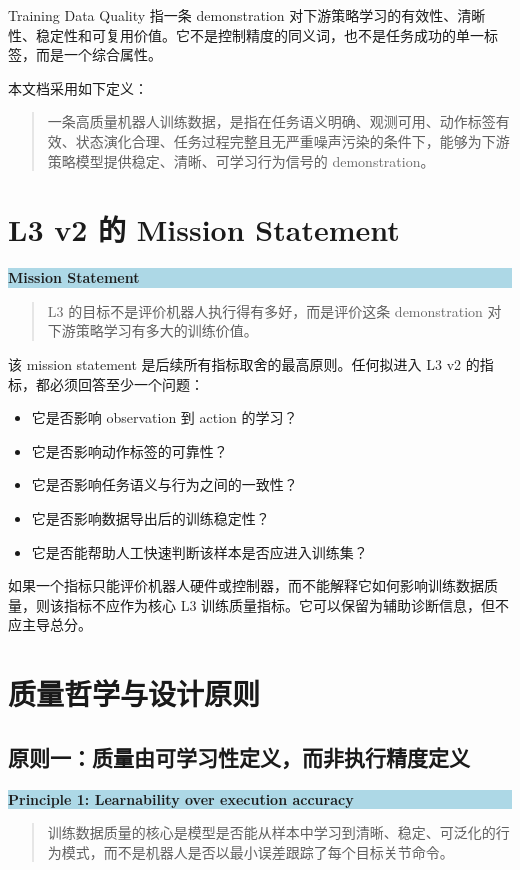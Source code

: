 \documentclass[UTF8,zihao=-4]{ctexart}
\newenvironment{principlebox}[1]{%
  \vspace{0.5em}\noindent\colorbox{LightBlue}{\parbox{0.97\linewidth}{\textbf{#1}\par\vspace{0.25em}}
  }\par\vspace{-0.8em}\noindent\begin{quote}\small
}{\end{quote}\vspace{0.4em}}
\begin{document}
Training Data Quality 指一条 demonstration 对下游策略学习的有效性、清晰性、稳定性和可复用价值。它不是控制精度的同义词，也不是任务成功的单一标签，而是一个综合属性。

本文档采用如下定义：

\begin{quote}
一条高质量机器人训练数据，是指在任务语义明确、观测可用、动作标签有效、状态演化合理、任务过程完整且无严重噪声污染的条件下，能够为下游策略模型提供稳定、清晰、可学习行为信号的 demonstration。
\end{quote}

\section{L3 v2 的 Mission Statement}

\begin{principlebox}{Mission Statement}
L3 的目标不是评价机器人执行得有多好，而是评价这条 demonstration 对下游策略学习有多大的训练价值。
\end{principlebox}

该 mission statement 是后续所有指标取舍的最高原则。任何拟进入 L3 v2 的指标，都必须回答至少一个问题：

\begin{itemize}
  \item 它是否影响 observation 到 action 的学习？
  \item 它是否影响动作标签的可靠性？
  \item 它是否影响任务语义与行为之间的一致性？
  \item 它是否影响数据导出后的训练稳定性？
  \item 它是否能帮助人工快速判断该样本是否应进入训练集？
\end{itemize}

如果一个指标只能评价机器人硬件或控制器，而不能解释它如何影响训练数据质量，则该指标不应作为核心 L3 训练质量指标。它可以保留为辅助诊断信息，但不应主导总分。

\section{质量哲学与设计原则}

\subsection{原则一：质量由可学习性定义，而非执行精度定义}

\begin{principlebox}{Principle 1: Learnability over execution accuracy}
训练数据质量的核心是模型是否能从样本中学习到清晰、稳定、可泛化的行为模式，而不是机器人是否以最小误差跟踪了每个目标关节命令。
\end{principlebox}
\end{document}
